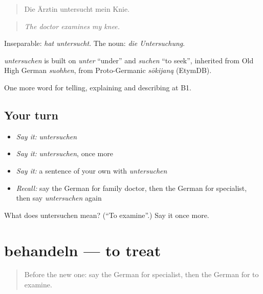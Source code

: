\begin{quote}
Die Ärztin untersucht mein Knie.
\end{quote}

\begin{quote}
\emph{The doctor examines my knee.}
\end{quote}

Inseparable: \emph{hat untersucht}. The noun: \emph{die Untersuchung}.

\begin{cousinweb}
\emph{untersuchen} is built on \emph{unter} \textquotedblleft{}under\textquotedblright{} and \emph{suchen} \textquotedblleft{}to seek\textquotedblright{}, inherited from Old High German \emph{suohhen}, from Proto-Germanic \emph{sōkijaną} (EtymDB).
\end{cousinweb}

\begin{grammarlens}[title={What you've built}]
One more word for telling, explaining and describing at B1.
\end{grammarlens}

\subsection*{Your turn}
\begin{itemize}
\raggedright
  \item \emph{Say it:} \emph{untersuchen}
  \item \emph{Say it:} \emph{untersuchen}, once more
  \item \emph{Say it:} a sentence of your own with \emph{untersuchen}
  \item \emph{Recall:} say the German for family doctor, then the German for specialist, then say \emph{untersuchen} again
\end{itemize}

\begin{tcolorbox}[breakable,colback=teal!4,colframe=teal!35!black,title={Before you move on}]
What does untersuchen mean? (\textquotedblleft{}To examine\textquotedblright{}.) Say it once more.
\end{tcolorbox}
\section[behandeln]{behandeln — to treat}

\label{lesson:GE-C487-behandeln}



\begin{quote}
Before the new one: say the German for specialist, then the German for to examine.
\end{quote}

